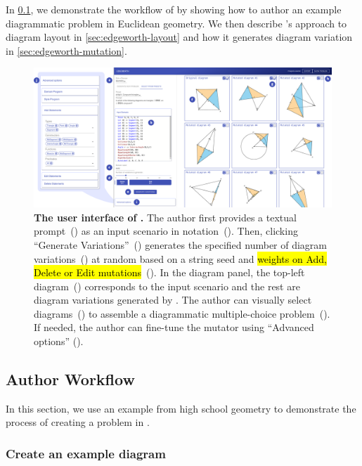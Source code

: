 In \cref{sec:edgeworth-workflow}, we demonstrate the workflow of \Edgeworth by showing how to author an example diagrammatic problem in Euclidean geometry. We then describe \Edgeworth's approach to diagram layout in \cref{sec:edgeworth-layout} and how it generates diagram variation in \cref{sec:edgeworth-mutation}. 


\begin{figure}
    \centering
    \includegraphics[width=\linewidth]{assets/chapter-3/edgeworth-ui-new.pdf}
    \caption{\textbf{The user interface of \Edgeworth.} \textmd{The author first provides a textual prompt~() as an input scenario in \Substance notation~(). Then, clicking ``Generate Variations''~() generates the specified number of diagram variations~() at random based on a string seed and \hl{weights on Add, Delete or Edit mutations}~(). In the diagram panel, the top-left diagram~() corresponds to the input scenario and the rest are diagram variations generated by \Edgeworth. The author can visually select diagrams~() to assemble a diagrammatic multiple-choice problem~(). If needed, the author can fine-tune the mutator using ``Advanced options'' (}). }
    \label{fig:edgeworth-interface}
\end{figure}

\subsection{Author Workflow}
\label{sec:edgeworth-workflow}

In this section, we use an example from high school geometry to demonstrate the process of creating a problem in \Edgeworth. 

\subsubsection{Create an example diagram} 
\label{sec:create-scenario}

